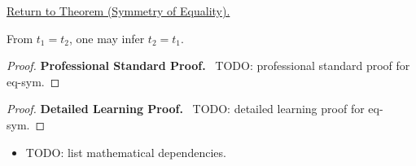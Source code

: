 \newpage
{}
\label{prf:eq-sym}

\begin{remark*}[Return]
\hyperref[thm:eq-sym]{Return to Theorem (Symmetry of Equality).}
\end{remark*}

\begin{theorem*}
From $t_1 = t_2$, one may infer $t_2 = t_1$.
\end{theorem*}

\begin{proof}
\textbf{Professional Standard Proof.}~
TODO: professional standard proof for eq-sym.
\end{proof}

\begin{proof}
\textbf{Detailed Learning Proof.}~
TODO: detailed learning proof for eq-sym.
\end{proof}

\begin{remark*}
\end{remark*}

\begin{dependencies}
\begin{itemize}
  \item TODO: list mathematical dependencies.
\end{itemize}
\end{dependencies}

\clearpage
